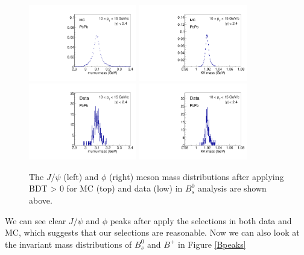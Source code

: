 \begin{figure}[h]
\begin{center}
\includegraphics[width=0.42\textwidth]{Figures/Chapter4/mc_PbPb_1_Bmumumass.pdf}
\includegraphics[width=0.42\textwidth]{Figures/Chapter4/mc_PbPb_1_Btktkmass.pdf}
\includegraphics[width=0.42\textwidth]{Figures/Chapter4/data_PbPb_1_Bmumumass.pdf}
\includegraphics[width=0.42\textwidth]{Figures/Chapter4/data_PbPb_1_Btktkmass.pdf}
\caption{The $J/\psi$ (left) and $\phi$ (right) meson mass distributions after applying BDT > 0 for MC (top) and data (low) in $B^0_s$ analysis are shown above.}
\label{mesonpeak}
\end{center}
\end{figure}

We can see clear $J/\psi$ and $\phi$ peaks after apply the selections in both data and MC, which suggests that our selections are reasonable. Now we can also look at the invariant mass distributions of $B^0_s$ and $B^+$ in Figure \ref{Bpeaks}

